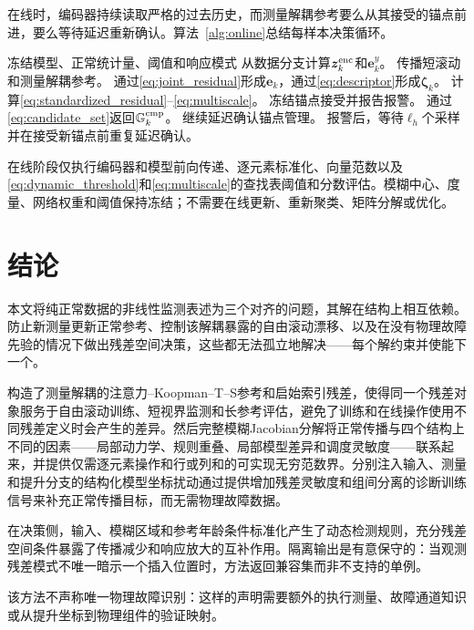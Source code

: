 \documentclass[journal]{IEEEtran}
\newcommand{\1}{\bm 1}
\begin{document}
在线时，编码器持续读取严格的过去历史，而测量解耦参考要么从其接受的锚点前进，要么等待延迟重新确认。算法~\ref{alg:online}总结每样本决策循环。

\begin{algorithm}[H]
\caption{在线监测}
\label{alg:online}
\begin{algorithmic}[1]
\Require 冻结模型、正常统计量、阈值和响应模式
\State 从数据分支计算$\bm z_k^{\rm enc}$和$\bm e_k^y$。
\State 传播短滚动和测量解耦参考。
\State 通过\eqref{eq:joint_residual}形成$\bm e_k$，通过\eqref{eq:descriptor}形成$\bm\zeta_k$。
\State 计算\eqref{eq:standardized_residual}--\eqref{eq:multiscale}。
\State 冻结锚点接受并报告报警。
\State 通过\eqref{eq:candidate_set}返回$\mathbb G_k^{\rm cmp}$。
\Else
\State 继续延迟确认锚点管理。
\EndIf
\State 报警后，等待$\ell_h$个采样并在接受新锚点前重复延迟确认。
\EndFor
\end{algorithmic}
\end{algorithm}

在线阶段仅执行编码器和模型前向传递、逐元素标准化、向量范数以及\eqref{eq:dynamic_threshold}和\eqref{eq:multiscale}的查找表阈值和分数评估。模糊中心、度量、网络权重和阈值保持冻结；不需要在线更新、重新聚类、矩阵分解或优化。

\section{结论}
本文将纯正常数据的非线性监测表述为三个对齐的问题，其解在结构上相互依赖。防止新测量更新正常参考、控制该解耦暴露的自由滚动漂移、以及在没有物理故障先验的情况下做出残差空间决策，这些都无法孤立地解决——每个解约束并使能下一个。

构造了测量解耦的注意力--Koopman--T--S参考和启始索引残差，使得同一个残差对象服务于自由滚动训练、短视界监测和长参考评估，避免了训练和在线操作使用不同残差定义时会产生的差异。然后完整模糊Jacobian分解将正常传播与四个结构上不同的因素——局部动力学、规则重叠、局部模型差异和调度灵敏度——联系起来，并提供仅需逐元素操作和行或列和的可实现无穷范数界。分别注入输入、测量和提升分支的结构化模型坐标扰动通过提供增加残差灵敏度和组间分离的诊断训练信号来补充正常传播目标，而无需物理故障数据。

在决策侧，输入、模糊区域和参考年龄条件标准化产生了动态检测规则，充分残差空间条件暴露了传播减少和响应放大的互补作用。隔离输出是有意保守的：当观测残差模式不唯一暗示一个插入位置时，方法返回兼容集而非不支持的单例。

该方法不声称唯一物理故障识别：这样的声明需要额外的执行测量、故障通道知识或从提升坐标到物理组件的验证映射。
\end{document}
